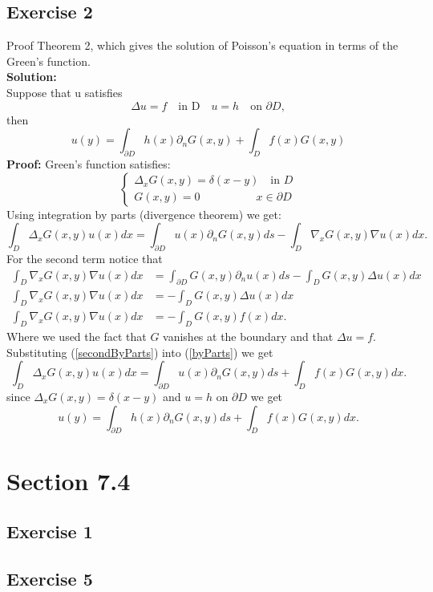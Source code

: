 \documentclass[12pt]{article}%
\begin{document}
\subsection*{Exercise 2}
Proof Theorem 2, which gives the solution of Poisson's equation in terms of the
Green's function.\\
\textbf{Solution:}\\
Suppose that u satisfies
\[
    \Delta u =f \quad \text{in D} \quad u=h \quad \text{on }\partial D,
\]
then
\[
    u(y)=\int_{\partial D}h(x)\partial_nG(x,y) + \int_D f(x)G(x,y)
\]
\textbf{Proof:}
Green's function satisfies:
\[
\begin{cases}
    \Delta_xG(x,y)=\delta(x-y) \quad \text{in } D\\
    G(x,y)=0 \qquad\qquad\quad x\in \partial D
\end{cases}
\]
Using integration by parts (divergence theorem) we get:
\begin{equation}\label{byParts}
    \int_D \Delta_x G(x,y)u(x)dx=\int_{\partial D} u(x)\partial_nG(x,y)ds - \int_D \nabla_xG(x,y)\nabla u(x)dx.
\end{equation}
For the second term notice that
\begin{align} \label{secondByParts}
    \int_D \nabla_xG(x,y)\nabla u(x)dx&=\int_{\partial D}G(x,y)\partial_nu(x)ds - \int_D G(x,y)\Delta u(x)dx \nonumber\\
    \int_D \nabla_xG(x,y)\nabla u(x)dx&=- \int_D G(x,y)\Delta u(x)dx \nonumber\\
    \int_D \nabla_xG(x,y)\nabla u(x)dx&=- \int_D G(x,y)f(x)dx.
\end{align}
Where we used the fact that $G$ vanishes at the boundary and that $\Delta u =f$.
Substituting (\ref{secondByParts}) into (\ref{byParts}) we get
\[
    \int_D \Delta_x G(x,y)u(x)dx=\int_{\partial D} u(x)\partial_nG(x,y)ds + \int_D f(x)G(x,y)dx.
\]
since $\Delta_xG(x,y)=\delta(x-y)$ and $u=h$ on $\partial D$ we get
\[
    u(y)=\int_{\partial D} h(x)\partial_nG(x,y)ds + \int_D f(x)G(x,y)dx.
\]
\section*{Section 7.4}
\subsection*{Exercise 1}
\subsection*{Exercise 5}
\end{document}
